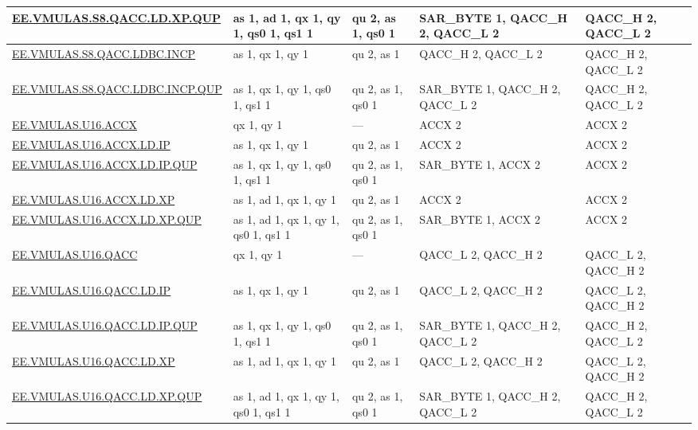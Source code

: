 \begin{longtable}[c]{|l|m{2.5cm}|m{2.5cm}|m{2.5cm}|m{2.5cm}|}
    \hyperref[instruction:EEVMULASS8QACCLDXPQUP]{EE.VMULAS.S8.QACC.LD.XP.QUP} & as 1, ad 1, qx 1, qy 1, qs0 1, qs1 1 & qu 2, as 1, qs0 1 & SAR\_BYTE 1, QACC\_H 2, QACC\_L 2 & QACC\_H 2, QACC\_L 2\\\hline
    \hyperref[instruction:EEVMULASS8QACCLDBCINCP]{EE.VMULAS.S8.QACC.LDBC.INCP} & as 1, qx 1, qy 1 & qu 2, as 1 & QACC\_H 2, QACC\_L 2 & QACC\_H 2, QACC\_L 2\\\hline
    \hyperref[instruction:EEVMULASS8QACCLDBCINCPQUP]{EE.VMULAS.S8.QACC.LDBC.INCP.QUP} & as 1, qx 1, qy 1, qs0 1, qs1 1 & qu 2, as 1, qs0 1 & SAR\_BYTE 1, QACC\_H 2, QACC\_L 2 & QACC\_H 2, QACC\_L 2\\\hline
    \hyperref[instruction:EEVMULASU16ACCX]{EE.VMULAS.U16.ACCX} & qx 1, qy 1 & — & ACCX 2 & ACCX 2\\\hline
    \hyperref[instruction:EEVMULASU16ACCXLDIP]{EE.VMULAS.U16.ACCX.LD.IP} & as 1, qx 1, qy 1 & qu 2, as 1 & ACCX 2 & ACCX 2\\\hline
    \hyperref[instruction:EEVMULASU16ACCXLDIPQUP]{EE.VMULAS.U16.ACCX.LD.IP.QUP} & as 1, qx 1, qy 1, qs0 1, qs1 1 & qu 2, as 1, qs0 1 & SAR\_BYTE 1, ACCX 2 & ACCX 2\\\hline
    \hyperref[instruction:EEVMULASU16ACCXLDXP]{EE.VMULAS.U16.ACCX.LD.XP} & as 1, ad 1, qx 1, qy 1 & qu 2, as 1 & ACCX 2 & ACCX 2\\\hline
    \hyperref[instruction:EEVMULASU16ACCXLDXPQUP]{EE.VMULAS.U16.ACCX.LD.XP.QUP} & as 1, ad 1, qx 1, qy 1, qs0 1, qs1 1 & qu 2, as 1, qs0 1 & SAR\_BYTE 1, ACCX 2 & ACCX 2\\\hline
    \hyperref[instruction:EEVMULASU16QACC]{EE.VMULAS.U16.QACC} & qx 1, qy 1 & — & QACC\_L 2, QACC\_H 2 & QACC\_L 2, QACC\_H 2\\\hline
    \hyperref[instruction:EEVMULASU16QACCLDIP]{EE.VMULAS.U16.QACC.LD.IP} & as 1, qx 1, qy 1 & qu 2, as 1 & QACC\_L 2, QACC\_H 2 & QACC\_L 2, QACC\_H 2\\\hline
    \hyperref[instruction:EEVMULASU16QACCLDIPQUP]{EE.VMULAS.U16.QACC.LD.IP.QUP} & as 1, qx 1, qy 1, qs0 1, qs1 1 & qu 2, as 1, qs0 1 & SAR\_BYTE 1, QACC\_H 2, QACC\_L 2 & QACC\_H 2, QACC\_L 2\\\hline
    \hyperref[instruction:EEVMULASU16QACCLDXP]{EE.VMULAS.U16.QACC.LD.XP} & as 1, ad 1, qx 1, qy 1 & qu 2, as 1 & QACC\_L 2, QACC\_H 2 & QACC\_L 2, QACC\_H 2\\\hline
    \hyperref[instruction:EEVMULASU16QACCLDXPQUP]{EE.VMULAS.U16.QACC.LD.XP.QUP} & as 1, ad 1, qx 1, qy 1, qs0 1, qs1 1 & qu 2, as 1, qs0 1 & SAR\_BYTE 1, QACC\_H 2, QACC\_L 2 & QACC\_H 2, QACC\_L 2\\\hline

\end{longtable}
